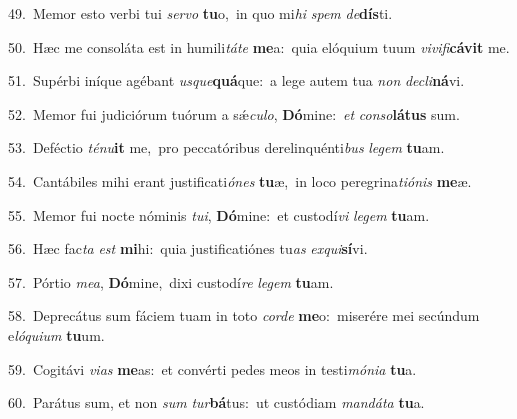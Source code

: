{\numbfont\textcolor{\numbcolor}{49.}}~Memor esto verbi tui \textit{ser}\-\textit{vo} \textbf{tu}\-o,~\star in quo mi\textit{hi} \textit{spem} \textit{de}\-\textbf{dís}ti.\par
{\numbfont\textcolor{\numbcolor}{50.}}~Hæc me consoláta est in humili\-\textit{tá}\-\textit{te} \textbf{me}\-a:~\star quia elóquium tuum \textit{vi}\-\textit{vi}\textit{fi}\textbf{cá}\textbf{vit} me.\par
{\numbfont\textcolor{\numbcolor}{51.}}~Supérbi iníque agébant \textit{us}\-\textit{que}\textbf{quá}que:~\star a lege autem tua \textit{non} \textit{de}\-\textit{cli}\textbf{ná}vi.\par
{\numbfont\textcolor{\numbcolor}{52.}}~Memor fui judiciórum tuórum a sǽ\-\textit{cu}\-\textit{lo}, \textbf{Dó}\-mine:~\star \textit{et} \textit{con}\-\textit{so}\textbf{lá}\textbf{tus} sum.\par
{\numbfont\textcolor{\numbcolor}{53.}}~Deféctio \textit{té}\-\textit{nu}\textbf{it} me,~\star pro peccatóribus derelinquénti\textit{bus} \textit{le}\-\textit{gem} \textbf{tu}\-am.\par
{\numbfont\textcolor{\numbcolor}{54.}}~Cantábiles mihi erant justificati\-\textit{ó}\-\textit{nes} \textbf{tu}\-æ,~\star in loco peregrina\-\textit{ti}\-\textit{ó}\textit{nis} \textbf{me}\-æ.\par
{\numbfont\textcolor{\numbcolor}{55.}}~Memor fui nocte nóminis \textit{tu}\-\textit{i}, \textbf{Dó}\-mine:~\star et custodí\textit{vi} \textit{le}\-\textit{gem} \textbf{tu}\-am.\par
{\numbfont\textcolor{\numbcolor}{56.}}~Hæc fac\textit{ta} \textit{est} \textbf{mi}\-hi:~\star quia justificatiónes tu\textit{as} \textit{ex}\-\textit{qui}\textbf{sí}vi.\par
{\numbfont\textcolor{\numbcolor}{57.}}~Pórtio \textit{me}\-\textit{a}, \textbf{Dó}\-mine,~\star dixi custodí\textit{re} \textit{le}\-\textit{gem} \textbf{tu}\-am.\par
{\numbfont\textcolor{\numbcolor}{58.}}~Deprecátus sum fáciem tuam in toto \textit{cor}\-\textit{de} \textbf{me}\-o:~\star miserére mei secúndum e\-\textit{ló}\-\textit{qui}\textit{um} \textbf{tu}\-um.\par
{\numbfont\textcolor{\numbcolor}{59.}}~Cogitávi \textit{vi}\-\textit{as} \textbf{me}\-as:~\star et convérti pedes meos in testi\-\textit{mó}\-\textit{ni}\textit{a} \textbf{tu}\-a.\par
{\numbfont\textcolor{\numbcolor}{60.}}~Parátus sum, et non \textit{sum} \textit{tur}\-\textbf{bá}tus:~\star ut custódiam \textit{man}\-\textit{dá}\textit{ta} \textbf{tu}\-a.\par
